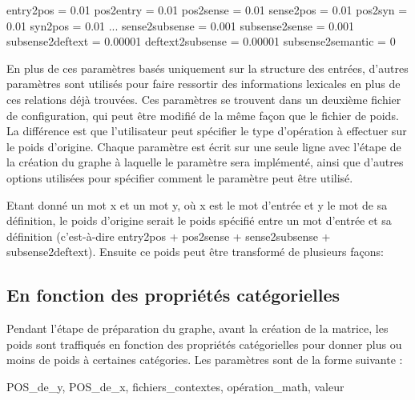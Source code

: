 \documentclass[a4paper, 12pt]{article}
\begin{document}
\begin{framed}
entry2pos = 0.01\newline
pos2entry = 0.01\newline
pos2sense = 0.01\newline
sense2pos = 0.01\newline
pos2syn = 0.01\newline
syn2pos = 0.01\newline
...\newline
sense2subsense = 0.001\newline
subsense2sense = 0.001\newline
subsense2deftext = 0.00001\newline
deftext2subsense = 0.00001\newline
subsense2semantic = 0\newline
\end{framed}

En plus de ces paramètres basés uniquement sur la structure des entrées, 
d'autres paramètres sont utilisés pour faire ressortir des informations 
lexicales en plus de ces relations déjà trouvées. Ces paramètres se trouvent 
dans un deuxième fichier de configuration, qui peut être modifié de la même 
façon que le fichier de poids. La différence est que l'utilisateur peut 
spécifier le type d'opération à effectuer sur le poids d'origine. Chaque 
paramètre est écrit sur une seule ligne avec l'étape de la création du graphe à 
laquelle le paramètre sera implémenté, ainsi que d'autres options utilisées pour 
spécifier comment le paramètre peut être utilisé.

Etant donné un mot x et un mot y, où x est le mot d'entrée et y le mot de sa 
définition, le poids d'origine serait le poids spécifié entre un mot d'entrée et 
sa définition (c'est-à-dire entry2pos + pos2sense + sense2subsense + 
subsense2deftext). Ensuite ce poids peut être transformé de plusieurs façons:


\subsection{En fonction des propriétés catégorielles}
Pendant l'étape de préparation du graphe, avant la création de la matrice, les 
poids sont traffiqués en fonction des propriétés catégorielles pour donner plus 
ou moins de poids à certaines catégories. Les paramètres sont de la forme 
suivante :
    \begin{framed}
        POS\_de\_y, POS\_de\_x, fichiers\_contextes, opération\_math, valeur
    \end{framed}
\end{document}
